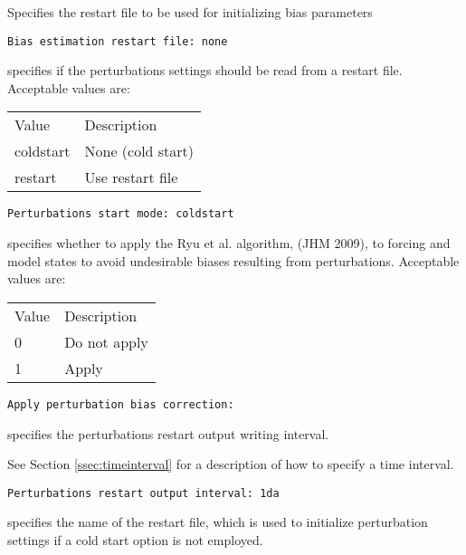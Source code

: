  
  Specifies the restart file to be
 used for initializing bias parameters 
 

 \begin{Verbatim}[frame=single]
Bias estimation restart file: none
 \end{Verbatim}

 
  specifies if the perturbations settings
 should be read from a restart file.
 Acceptable values are: 

 \begin{tabular}{ll}
 Value     & Description       \\
 coldstart & None (cold start) \\
 restart   & Use restart file  \\
 \end{tabular}
 

 \begin{Verbatim}[frame=single]
Perturbations start mode: coldstart
 \end{Verbatim}

 
  specifies whether
 to apply the Ryu et al. algorithm, (JHM 2009), to forcing and
 model states to avoid undesirable biases resulting from perturbations.
 Acceptable values are: 

 \begin{tabular}{ll}
 Value & Description  \\
 0     & Do not apply \\
 1     & Apply        \\
 \end{tabular}
 

 \begin{Verbatim}[frame=single]
Apply perturbation bias correction:
 \end{Verbatim}

 
  specifies the
 perturbations restart output writing interval.

 See Section \ref{ssec:timeinterval} for a description
 of how to specify a time interval.
 

 \begin{Verbatim}[frame=single]
Perturbations restart output interval: 1da
 \end{Verbatim}

 
  specifies the name of the 
 restart file, which is used to initialize perturbation settings
 if a cold start option is not employed. 
 

